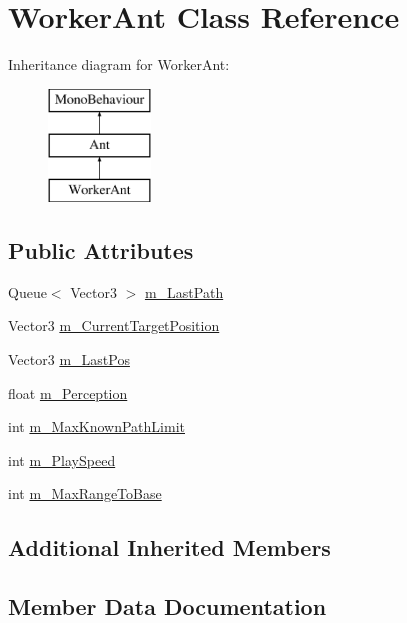 \hypertarget{class_worker_ant}{}\section{Worker\+Ant Class Reference}
\label{class_worker_ant}
Inheritance diagram for Worker\+Ant\+:\begin{figure}[H]
\begin{center}
\leavevmode
\includegraphics[height=3.000000cm]{class_worker_ant}
\end{center}
\end{figure}
\subsection*{Public Attributes}
\begin{DoxyCompactItemize}
\item 
Queue$<$ Vector3 $>$ \mbox{\hyperlink{class_worker_ant_a4a50d4a7d865547a348342cc4ec0a74c}{m\+\_\+\+Last\+Path}}
\item 
Vector3 \mbox{\hyperlink{class_worker_ant_a105722580d3f823aef56419f802a5a1a}{m\+\_\+\+Current\+Target\+Position}}
\item 
Vector3 \mbox{\hyperlink{class_worker_ant_a794c5ad415a6413a9ae2888202dae498}{m\+\_\+\+Last\+Pos}}
\item 
float \mbox{\hyperlink{class_worker_ant_ac8f5e0080f43089ba4ea7dcedc399a03}{m\+\_\+\+Perception}}
\item 
int \mbox{\hyperlink{class_worker_ant_a537b3cac68ea915dd55ed624e9595e5d}{m\+\_\+\+Max\+Known\+Path\+Limit}}
\item 
int \mbox{\hyperlink{class_worker_ant_ac64e685cce8ea571a1f79b9958a1aeb2}{m\+\_\+\+Play\+Speed}}
\item 
int \mbox{\hyperlink{class_worker_ant_a3159907108a86996b34b14da0dc6c45a}{m\+\_\+\+Max\+Range\+To\+Base}}
\end{DoxyCompactItemize}
\subsection*{Additional Inherited Members}


\subsection{Member Data Documentation}
\mbox{\label{class_worker_ant_a105722580d3f823aef56419f802a5a1a}} 
